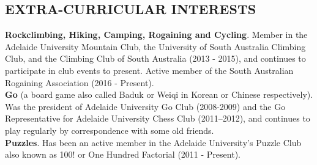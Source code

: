 \documentclass{res}
\begin{document}
\begin{resume}
\section{EXTRA-CURRICULAR INTERESTS}
{\bf Rockclimbing, Hiking, Camping, Rogaining and Cycling}.
Member in the Adelaide University Mountain Club, the University of South Australia Climbing Club, and the Climbing Club of South Australia (2013 - 2015), and continues to participate in club events to present. Active member of the South Australian Rogaining Association (2016 - Present).  \\
{\bf Go} (a board game also called Baduk or Weiqi in Korean or Chinese respectively). Was the president of Adelaide University Go Club (2008-2009) and the Go Representative for Adelaide University Chess Club (2011--2012), and continues to play regularly by correspondence with some old friends. \\
{\bf Puzzles}. Has been an active member in the Adelaide University's Puzzle Club also known as 100! or One Hundred Factorial (2011 - Present). \\

\end{resume}
\end{document}
